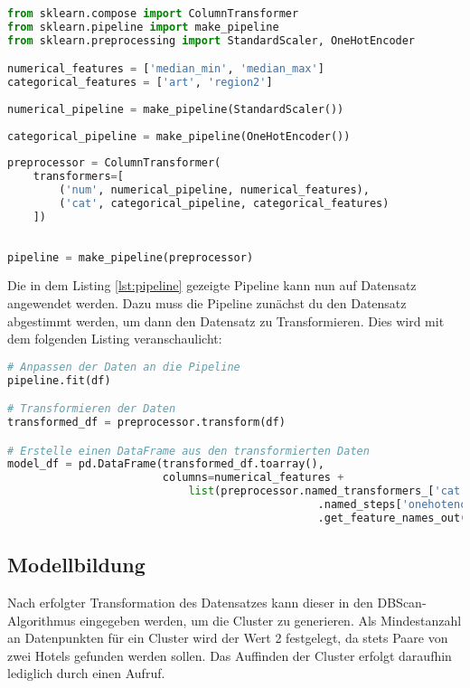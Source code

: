 \begin{lstlisting}[language=Python, label=lst:pipeline, caption=Datensatz Pipeline]
from sklearn.compose import ColumnTransformer
from sklearn.pipeline import make_pipeline
from sklearn.preprocessing import StandardScaler, OneHotEncoder

numerical_features = ['median_min', 'median_max']
categorical_features = ['art', 'region2']
    
numerical_pipeline = make_pipeline(StandardScaler())
    
categorical_pipeline = make_pipeline(OneHotEncoder())
    
preprocessor = ColumnTransformer(
    transformers=[
        ('num', numerical_pipeline, numerical_features),
        ('cat', categorical_pipeline, categorical_features)
    ])
    
    
pipeline = make_pipeline(preprocessor)
\end{lstlisting}

Die in dem Listing \ref{lst:pipeline} gezeigte Pipeline kann nun auf Datensatz angewendet werden. Dazu muss die Pipeline zunächst du den Datensatz abgestimmt werden, um dann den Datensatz zu Transformieren. Dies wird mit dem folgenden Listing veranschaulicht:

\begin{lstlisting}[language=Python, label=lst:pipeline2, caption=Ausführung der Pipeline auf dem Datensatz]
# Anpassen der Daten an die Pipeline
pipeline.fit(df)

# Transformieren der Daten
transformed_df = preprocessor.transform(df)

# Erstelle einen DataFrame aus den transformierten Daten
model_df = pd.DataFrame(transformed_df.toarray(), 
                        columns=numerical_features + 
                            list(preprocessor.named_transformers_['cat']
                                                .named_steps['onehotencoder']
                                                .get_feature_names_out(categorical_features)))
\end{lstlisting}

\subsection{Modellbildung} 
Nach erfolgter Transformation des Datensatzes kann dieser in den DBScan-Algorithmus eingegeben werden, um die Cluster zu generieren. Als Mindestanzahl an Datenpunkten für ein Cluster wird der Wert 2 festgelegt, da stets Paare von zwei Hotels gefunden werden sollen. Das Auffinden der Cluster erfolgt daraufhin lediglich durch einen Aufruf.


